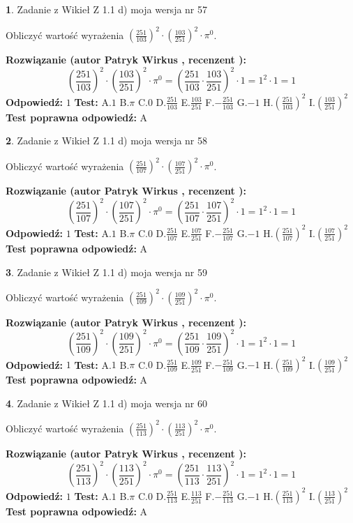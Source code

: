 \documentclass[12pt, a4paper]{article}
\theoremstyle{definition} %
\newtheorem{zad}{}
\newcommand{\zadStart}[1]{\begin{zad}#1\newline}
\newcommand{\zadStop}{\end{zad}}
\newcommand{\rozwStart}[2]{\noindent \textbf{Rozwiązanie (autor #1 , recenzent #2): }\newline}
\newcommand{\rozwStop}{\newline}
\newcommand{\odpStart}{\noindent \textbf{Odpowiedź:}\newline}
\newcommand{\odpStop}{\newline}
\newcommand{\testStart}{\noindent \textbf{Test:}\newline}
\newcommand{\testStop}{\newline}
\newcommand{\kluczStart}{\noindent \textbf{Test poprawna odpowiedź:}\newline}
\newcommand{\kluczStop}{\newline}
\begin{document}
\zadStart{Zadanie z Wikieł Z 1.1 d) moja wersja nr 57}

Obliczyć wartość wyrażenia $(\frac{251}{103})^{2} \cdot (\frac{103}{251})^{2} \cdot \pi^{0}$.
\zadStop
\rozwStart{Patryk Wirkus}{}
$$(\frac{251}{103})^{2} \cdot (\frac{103}{251})^{2} \cdot \pi^{0} = (\frac{251}{103} \cdot \frac{103}{251})^{2} \cdot 1 = 1^{2} \cdot 1 = 1$$
\rozwStop
\odpStart
$1$
\odpStop
\testStart
A.$1$ B.$\pi$ C.$0$ D.$\frac{251}{103}$ E.$\frac{103}{251}$
F.$-\frac{251}{103}$ G.$-1$
H.$(\frac{251}{103})^{2}$
I.$(\frac{103}{251})^{2}$
\testStop
\kluczStart
A
\kluczStop



\zadStart{Zadanie z Wikieł Z 1.1 d) moja wersja nr 58}

Obliczyć wartość wyrażenia $(\frac{251}{107})^{2} \cdot (\frac{107}{251})^{2} \cdot \pi^{0}$.
\zadStop
\rozwStart{Patryk Wirkus}{}
$$(\frac{251}{107})^{2} \cdot (\frac{107}{251})^{2} \cdot \pi^{0} = (\frac{251}{107} \cdot \frac{107}{251})^{2} \cdot 1 = 1^{2} \cdot 1 = 1$$
\rozwStop
\odpStart
$1$
\odpStop
\testStart
A.$1$ B.$\pi$ C.$0$ D.$\frac{251}{107}$ E.$\frac{107}{251}$
F.$-\frac{251}{107}$ G.$-1$
H.$(\frac{251}{107})^{2}$
I.$(\frac{107}{251})^{2}$
\testStop
\kluczStart
A
\kluczStop



\zadStart{Zadanie z Wikieł Z 1.1 d) moja wersja nr 59}

Obliczyć wartość wyrażenia $(\frac{251}{109})^{2} \cdot (\frac{109}{251})^{2} \cdot \pi^{0}$.
\zadStop
\rozwStart{Patryk Wirkus}{}
$$(\frac{251}{109})^{2} \cdot (\frac{109}{251})^{2} \cdot \pi^{0} = (\frac{251}{109} \cdot \frac{109}{251})^{2} \cdot 1 = 1^{2} \cdot 1 = 1$$
\rozwStop
\odpStart
$1$
\odpStop
\testStart
A.$1$ B.$\pi$ C.$0$ D.$\frac{251}{109}$ E.$\frac{109}{251}$
F.$-\frac{251}{109}$ G.$-1$
H.$(\frac{251}{109})^{2}$
I.$(\frac{109}{251})^{2}$
\testStop
\kluczStart
A
\kluczStop



\zadStart{Zadanie z Wikieł Z 1.1 d) moja wersja nr 60}

Obliczyć wartość wyrażenia $(\frac{251}{113})^{2} \cdot (\frac{113}{251})^{2} \cdot \pi^{0}$.
\zadStop
\rozwStart{Patryk Wirkus}{}
$$(\frac{251}{113})^{2} \cdot (\frac{113}{251})^{2} \cdot \pi^{0} = (\frac{251}{113} \cdot \frac{113}{251})^{2} \cdot 1 = 1^{2} \cdot 1 = 1$$
\rozwStop
\odpStart
$1$
\odpStop
\testStart
A.$1$ B.$\pi$ C.$0$ D.$\frac{251}{113}$ E.$\frac{113}{251}$
F.$-\frac{251}{113}$ G.$-1$
H.$(\frac{251}{113})^{2}$
I.$(\frac{113}{251})^{2}$
\testStop
\kluczStart
A
\kluczStop
\end{document}
